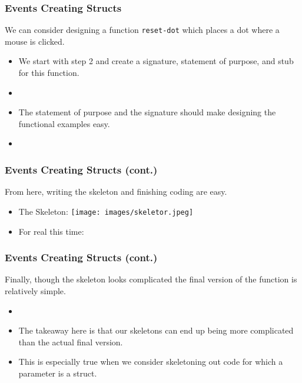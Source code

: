 \documentclass{beamer}
\begin{document}
\begin{frame}
  \frametitle{Events Creating Structs}
  We can consider designing a function \texttt{reset-dot}
  which places a dot where a mouse is clicked.
  \begin{itemize}
  \item<2-> We start with step 2 and create a signature, statement of
    purpose, and stub for this function.
  \item<3-> \ResetDotHeader
  \item<4-> The statement of purpose and the signature should make
    designing the functional examples easy.
  \item<5-> \ResetDotExamples
  \end{itemize}
\end{frame}

\begin{frame}
  \frametitle{Events Creating Structs (cont.)}
  From here, writing the skeleton and finishing coding are easy.
  \begin{itemize}
  \item<2-> The Skeleton:    
    \texttt{[image: images/skeletor.jpeg]}
  \item<3-> For real this time:    \ResetDotSkeleton
  \end{itemize}
\end{frame}

\begin{frame}
  \frametitle{Events Creating Structs (cont.)}
      Finally, though the skeleton looks complicated the final version
    of the function is relatively simple.
  \begin{itemize}
  \item<2-> \ResetDotFinal
  \item<3-> The takeaway here is that our skeletons can end up being
    more complicated than the actual final version.
  \item<4-> This is especially true when we consider skeletoning
    out code for which a parameter is a struct.
  \end{itemize}
\end{frame}

\end{document}
